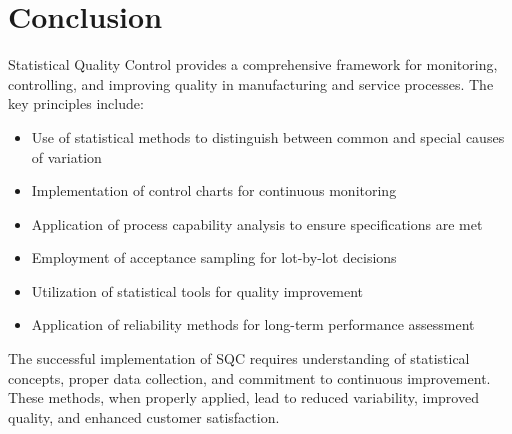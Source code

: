 \documentclass[twoside]{book}
\begin{document}
\section{Conclusion}

Statistical Quality Control provides a comprehensive framework for monitoring, controlling, and improving quality in manufacturing and service processes. The key principles include:

\begin{itemize}
    \item Use of statistical methods to distinguish between common and special causes of variation
    \item Implementation of control charts for continuous monitoring
    \item Application of process capability analysis to ensure specifications are met
    \item Employment of acceptance sampling for lot-by-lot decisions
    \item Utilization of statistical tools for quality improvement
    \item Application of reliability methods for long-term performance assessment
\end{itemize}

The successful implementation of SQC requires understanding of statistical concepts, proper data collection, and commitment to continuous improvement. These methods, when properly applied, lead to reduced variability, improved quality, and enhanced customer satisfaction.
\end{document}
